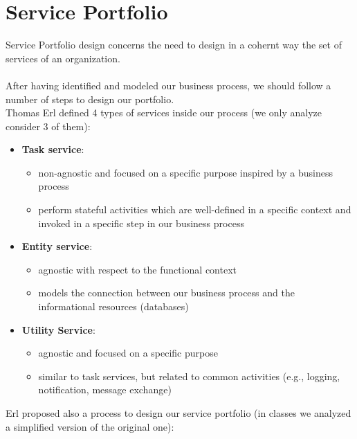 \documentclass[10pt,a4paper]{article}
\begin{document}
\section{Service Portfolio}
Service Portfolio design concerns the need to design in a cohernt way the set of services of an organization. \\ \\
After having identified and modeled our business process, we should follow a number of steps to design our portfolio. \\ Thomas Erl defined 4 types of services inside our process (we only analyze consider 3 of them):
\begin{itemize}
	\item \textbf{Task service}: 
	\begin{itemize}
		\item non-agnostic and focused on a specific purpose inspired by a business process
		\item perform stateful activities which are well-defined in a specific context and invoked in a specific step in our business process
	\end{itemize}
	\item \textbf{Entity service}:
	\begin{itemize}
		\item agnostic with respect to the functional context
		\item models the connection between our business process and the informational resources (databases)
	\end{itemize}
	\item \textbf{Utility Service}:
	\begin{itemize}
		\item agnostic and focused on a specific purpose
		\item similar to task services, but related to common activities (e.g., logging, notification, message exchange)
	\end{itemize}
\end{itemize}
Erl proposed also a process to design our service portfolio (in classes we analyzed a simplified version of the original one):
\end{document}
